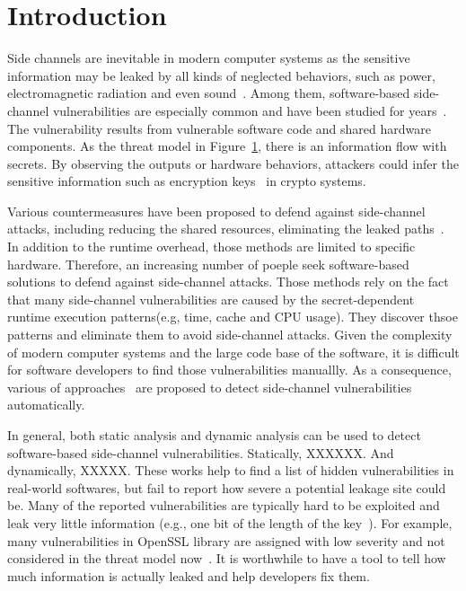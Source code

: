 \section{Introduction}
Side channels are inevitable in modern computer systems as the sensitive information 
may be leaked by all kinds of neglected behaviors, 
such as power, electromagnetic radiation and even sound~\cite{}. 
Among them, software-based side-channel vulnerabilities are especially common and have been studied for years~\cite{}. 
The vulnerability results from vulnerable software code and shared hardware components.
As the threat model in Figure~\ref{}, there is an information flow with secrets.  
By observing the outputs or hardware behaviors, attackers could 
infer the sensitive information such as encryption keys~\cite{} in crypto 
systems.

Various countermeasures have been proposed to defend against 
side-channel attacks, including reducing the shared resources,
eliminating the leaked paths~\cite{182946,203878,217537}. 
In addition to the runtime overhead, those methods are limited to specific hardware.
Therefore, an increasing number of poeple seek software-based solutions to 
defend against side-channel attacks. Those methods rely on the 
fact that many side-channel vulnerabilities are caused by the 
secret-dependent runtime execution patterns(e.g, time, cache and CPU usage). 
They discover thsoe patterns and eliminate them to avoid side-channel attacks. 
Given the complexity of modern computer systems and the large code base of the
software, it is difficult for software developers to find those vulnerabilities
manuallly. As a consequence, various of approaches~\cite{182946,203878,Osvik:2006:CAC:2117739.2117741} 
are proposed to detect side-channel vulnerabilities automatically.


In general, both static analysis and dynamic analysis
can be used to detect software-based side-channel vulnerabilities.
Statically, XXXXXX. And dynamically, XXXXX.
These works help to find a list of hidden vulnerabilities in real-world softwares, 
but fail to report how severe a potential leakage site could be. 
Many of the reported vulnerabilities are typically hard to be exploited 
and leak very little information (e.g., one bit of the length of the key~\cite{203878}).  
For example, many vulnerabilities in OpenSSL library are assigned with low severity and not considered 
in the threat model now~\cite{OpenSSL:Security:Policy}. 
It is worthwhile to have a tool to tell how much information is actually leaked and help 
developers fix them.

